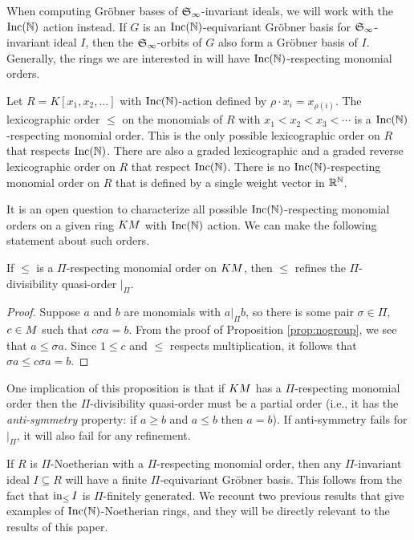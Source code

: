 When computing Gr\"obner bases of $\mathfrak S_\infty$-invariant ideals, we will work with the $\operatorname{Inc}(\mathbb N)$ action instead.  If $G$ is an $\operatorname{Inc}(\mathbb N)$-equivariant Gr\"obner basis for $\mathfrak S_\infty$-invariant ideal $I$, then the $\mathfrak S_\infty$-orbits of $G$ also form a Gr\"obner basis of $I$.  Generally, the rings we are interested in will have $\operatorname{Inc}(\mathbb N)$-respecting monomial orders.

\begin{example}
 Let $R = K[x_1,x_2,\ldots]$ with $\operatorname{Inc}(\mathbb N)$-action defined by $\rho \cdot x_i = x_{\rho(i)}$.  The lexicographic order $\leq$ on the monomials of $R$ with $x_1 < x_2 < x_3 < \cdots$ is a $\operatorname{Inc}(\mathbb N)$-respecting monomial order.  This is the only possible lexicographic order on $R$ that respects $\operatorname{Inc}(\mathbb N)$.  There are also a graded lexicographic and a graded reverse lexicographic order on $R$ that respect $\operatorname{Inc}(\mathbb N)$.  There is no $\operatorname{Inc}(\mathbb N)$-respecting monomial order on $R$ that is defined by a single weight vector in $\mathbb R^{\mathbb N}$.
\end{example}

It is an open question to characterize all possible $\operatorname{Inc}(\mathbb N)$-respecting monomial orders on a given ring $KM$ with $\operatorname{Inc}(\mathbb N)$ action.  We can make the following statement about such orders.

\begin{proposition}
 If $\leq$ is a $\Pi$-respecting monomial order on $KM$, then $\leq$ refines the $\Pi$-divisibility quasi-order $|_\Pi$.
\end{proposition}
\begin{proof}
 Suppose $a$ and $b$ are monomials with $a |_\Pi b$, so there is some pair $\sigma \in \Pi$, $c \in M$ such that $c\sigma a = b$.  From the proof of Proposition \ref{prop:nogroup}, we see that $a \leq \sigma a$.  Since $1 \leq c$ and $\leq$ respects multiplication, it follows that $\sigma a \leq c\sigma a = b$.
\end{proof}

One implication of this proposition is that if $KM$ has a $\Pi$-respecting monomial order then the $\Pi$-divisibility quasi-order must be a partial order (i.e., it has the \textit{anti-symmetry} property: if $a \geq b$ and $a \leq b$ then $a = b$).  If anti-symmetry fails for $|_\Pi$, it will also fail for any refinement.

If $R$ is $\Pi$-Noetherian with a $\Pi$-respecting monomial order, then any $\Pi$-invariant ideal $I \subseteq R$ will have a finite $\Pi$-equivariant Gr\"obner basis.  This follows from the fact that $\operatorname{in}_{\leq} I$ is $\Pi$-finitely generated.  We recount two previous results that give examples of $\operatorname{Inc}(\mathbb N)$-Noetherian rings, and they will be directly relevant to the results of this paper.


